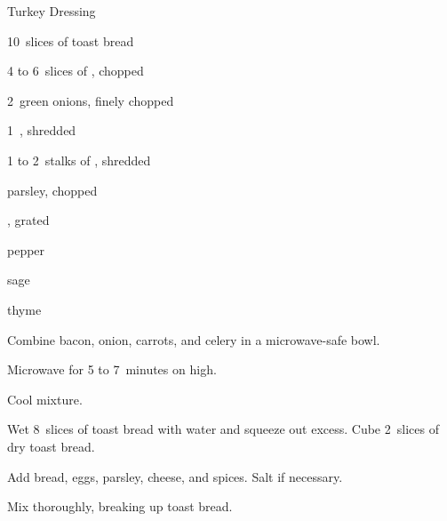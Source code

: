 \begin{recipe}{Turkey Dressing}{}{}

\begin{ingredients}
\item 10~slices of toast bread
\item 4 to 6~slices of , chopped
\item 2~green onions, finely chopped
\item 1~, shredded
\item 1 to 2~stalks of , shredded
\item \C{\quarter} parsley, chopped
\item \C{\quarter} , grated
\item pepper
\item sage
\item thyme
\end{ingredients}

\begin{directions}
\item Combine bacon, onion, carrots, and celery in a microwave-safe bowl.
\item Microwave for 5 to 7~minutes on high.
\item Cool mixture.
\item Wet 8~slices of toast bread with water and squeeze out excess. Cube 2~slices of dry toast bread.
\item Add bread, eggs, parsley, cheese, and spices. Salt if necessary.
\item Mix thoroughly, breaking up toast bread.
\end{directions}

\end{recipe}
